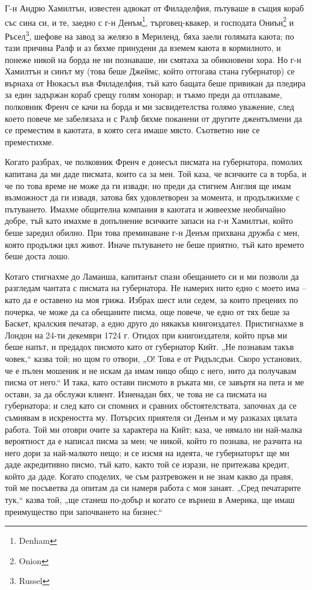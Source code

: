 \documentclass[12pt]{book}
\begin{document}
Г-н Андрю Хамилтън, известен адвокат от Филаделфия, пътуваше в същия кораб със сина  си, и те, заедно с г-н Денъм\footnote{Denham}, търговец-квакер, и господата Ониън\footnote{Onion} и Ръсел\footnote{Russel}, шефове на завод за желязо в Мериленд, бяха заели голямата каюта; по тази причина Ралф и аз бяхме принудени да вземем каюта в кормилното, и понеже никой на борда не ни познаваше, ни смятаха за обикновени хора. Но г-н Хамилтън и синът му (това беше Джеймс, който оттогава стана губернатор) се върнаха от Нюкасъл във Филаделфия, тъй като бащата беше привикан да пледира за един задържан кораб срещу голям хонорар; и тъкмо преди да отплаваме, полковник Френч се качи на борда и ми засвидетелства голямо уважение, след което повече ме забелязаха и с Ралф бяхме поканени от другите джентълмени да се преместим в каютата, в която сега имаше място. Съответно ние се преместихме.

Когато разбрах, че полковник Френч е донесъл писмата на губернатора, помолих капитана да ми даде писмата, които са за мен. Той каза, че всичките са в торба, и че по това време не може да ги извади; но преди да стигнем Англия ще имам възможност да ги извадя, затова бях удовлетворен за момента, и продължихме с пътуването. Имахме общителна компания в каютата и живеехме необичайно добре, тъй като имахме в допълнение всичките запаси на г-н Хамилтън, който беше заредил обилно. При това преминаване г-н Денъм прихвана дружба с мен, която продължи цял живот. Иначе пътуването не беше приятно, тъй като времето беше доста лошо.

Котаго стигнахме до Ламанша, капитанът спази обещанието си и ми позволи да разгледам чантата с писмата на губернатора. Не намерих нито едно с моето има – като да е оставено на моя грижа. Избрах шест или седем, за които прецених по почерка, че може да са обещаните писма, още повече, че едно от тях беше за Баскет, кралския печатар, а едно друго до някакъв книгоиздател. Пристигнахме в Лондон на 24-ти декември 1724 г. Отидох при книгоиздателя, който пръв ми беше напът, и предадох писмото като от губернатор Кийт. „Не познавам такъв човек,“ казва той; но щом го отвори, „О! Това е от Ридълсдън. Скоро установих, че е пълен мошеник и не искам да имам нищо общо с него, нито да получавам писма от него.“ И така, като остави писмото в ръката ми, се завъртя на пета и ме остави, за да обслужи клиент. Изненадан бях, че това не са писмата на губернатора; и след като си спомних и сравних обстоятелствата, започнах да се съмнявам в искреността му. Потърсих приятеля си Денъм и му разказах цялата работа. Той ми отоври очите за характера на Кийт; каза, че нямало ни най-малка вероятност да е написал писма за мен; че никой, който го познава, не разчита на него дори за най-малкото нещо; и се изсмя на идеята, че губернаторът ще ми даде акредитивно писмо, тъй като, както той се изрази, не притежава кредит, който да даде. Когато споделих, че съм разтревожен и не знам какво да правя, той ме посъветва да опитам да си намеря работа с моя занаят. „Сред печатарите тук,“ казва той, „ще станеш по-добър и когато се върнеш в Америка, ще имаш преимущество при започването на бизнес.“
\end{document}
